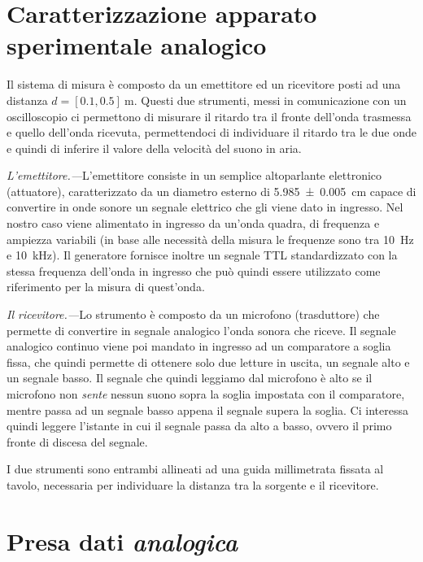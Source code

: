 \documentclass[
    rmp,
    reprint, 
    superscriptaddress, 
    altaffilletter, 
    amsmath, 
    amssymb, 
    a4paper,
    varvw]{revtex4-2}
\begin{document}
\section{Caratterizzazione apparato sperimentale analogico}

Il sistema di misura è composto da un emettitore ed un ricevitore posti ad una distanza $d=[0.1, 0.5]~\si{\metre}$. Questi due strumenti, messi in comunicazione con un oscilloscopio ci permettono di misurare il ritardo tra il fronte dell'onda trasmessa e quello dell'onda ricevuta, permettendoci di individuare il ritardo tra le due onde e quindi di inferire il valore della velocità del suono in aria. 

\textit{L'emettitore.---}L'emettitore consiste in un semplice altoparlante elettronico (attuatore), caratterizzato da un diametro esterno di \SI{5.985+-0.005}{\centi\metre} capace di convertire in onde sonore un segnale elettrico che gli viene dato in ingresso. Nel nostro caso viene alimentato in ingresso da un'onda quadra, di frequenza e ampiezza variabili (in base alle necessità della misura le frequenze sono tra \SI{10}{\hertz} e \SI{10}{\kilo\hertz}). Il generatore fornisce inoltre un segnale TTL standardizzato con la stessa frequenza dell'onda in ingresso che può quindi essere utilizzato come riferimento per la misura di quest'onda.

\textit{Il ricevitore.---}Lo strumento è composto da un microfono (trasduttore) che permette di convertire in segnale analogico l'onda sonora che riceve. Il segnale analogico continuo viene poi mandato in ingresso ad un comparatore a soglia fissa\iffalse(automaticamente impostata ad un valore di \SI{00}{\volt})\fi, che quindi permette di ottenere solo due letture in uscita, un segnale alto e un segnale basso. Il segnale che quindi leggiamo dal microfono è alto se il microfono non \emph{sente} nessun suono sopra la soglia impostata con il comparatore, mentre passa ad un segnale basso appena il segnale supera la soglia. Ci interessa quindi leggere l'istante in cui il segnale passa da alto a basso, ovvero il primo fronte di discesa del segnale. 

I due strumenti sono entrambi allineati ad una guida millimetrata fissata al tavolo, necessaria per individuare la distanza tra la sorgente e il ricevitore. 

\section{Presa dati \emph{analogica}}
\end{document}
